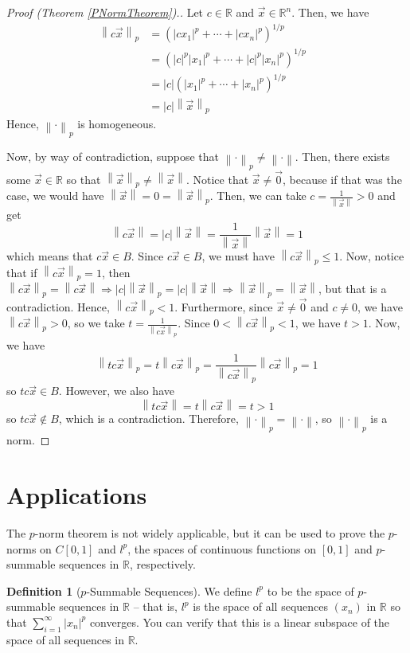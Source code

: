 \documentclass{article}
\renewcommand{\implies}{\Rightarrow}
\newcommand{\R}{\mathbb{R}}
\newcommand{\norm}[1]{\left\|#1\right\|}
\theoremstyle{plain} %
\numberwithin{thm}{section} %
\theoremstyle{definition} %
\newtheorem{defn}[thm]{Definition}
\begin{document}
\begin{proof}[Proof (Theorem \ref{PNormTheorem}).]
Let $c \in \R$ and $\vec{x} \in \R^n$. Then, we have
\begin{align*}
    \norm{c\vec{x}}_p
    &= (|cx_1|^p + \cdots + |cx_n|^p)^{1/p} &\\
    &= (|c|^p|x_1|^p + \cdots + |c|^p|x_n|^p)^{1/p} &\\
    &= |c|(|x_1|^p + \cdots + |x_n|^p)^{1/p} &\\
    &= |c|\norm{\vec{x}}_p
\end{align*}
Hence, $\norm{\cdot}_p$ is homogeneous.

Now, by way of contradiction, suppose that $\norm{\cdot}_p \neq \norm{\cdot}$. Then, there exists some $\vec{x} \in \R$ so that $\norm{\vec{x}}_p \neq \norm{\vec{x}}$. Notice that $\vec{x} \neq \vec{0}$, because if that was the case, we would have $\norm{\vec{x}} = 0 = \norm{\vec{x}}_p$. Then, we can take $c = \frac{1}{\norm{\vec{x}}} > 0$ and get
\[
    \norm{c\vec{x}} = |c|\norm{\vec{x}} = \frac{1}{\norm{\vec{x}}}\norm{\vec{x}} = 1
\]
which means that $c\vec{x} \in B$. Since $c\vec{x} \in B$, we must have $\norm{c\vec{x}}_p \leq 1$. Now, notice that if $\norm{c\vec{x}}_p = 1$, then $\norm{c\vec{x}}_p = \norm{c\vec{x}} \implies |c|\norm{\vec{x}}_p = |c|\norm{\vec{x}} \implies \norm{\vec{x}}_p = \norm{\vec{x}}$, but that is a contradiction. Hence, $\norm{c\vec{x}}_p < 1$. Furthermore, since $\vec{x} \neq \vec{0}$ and $c \neq 0$, we have $\norm{c\vec{x}}_p > 0$, so we take $t = \frac{1}{\norm{c\vec{x}}_p}$. Since $0 < \norm{c\vec{x}}_p < 1$, we have $t > 1$. Now, we have 
\[
\norm{tc\vec{x}}_p = t\norm{c\vec{x}}_p = \frac{1}{\norm{c\vec{x}}_p}\norm{c\vec{x}}_p = 1
\]
so $tc\vec{x} \in B$. However, we also have
\[
    \norm{tc\vec{x}} = t\norm{c\vec{x}} = t > 1
\]
so $tc\vec{x} \notin B$, which is a contradiction. Therefore, $\norm{\cdot}_p = \norm{\cdot}$, so $\norm{\cdot}_p$ is a norm.

\end{proof}

\section{Applications}

The $p$-norm theorem is not widely applicable, but it can be used to prove the $p$-norms on $C[0, 1]$ and $l^p$, the spaces of continuous functions on $[0, 1]$ and $p$-summable sequences in $\R$, respectively.

\begin{defn}[$p$-Summable Sequences]
    We define $l^p$ to be the space of $p$-summable sequences in $\R$ -- that is, $l^p$ is the space of all sequences $(x_n)$ in $\R$ so that $\sum_{i = 1}^\infty |x_n|^p$ converges. You can verify that this is a linear subspace of the space of all sequences in $\R$.
\end{defn}
\end{document}
